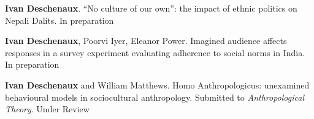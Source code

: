 


\begin{cvpublications}

  \cvpublication
  {\textbf{Ivan Deschenaux}. ``No culture of our own'': the impact of ethnic politics on Nepali Dalits.} %
    {In preparation} %

  \cvpublication
  {\textbf{Ivan Deschenaux}, Poorvi Iyer, Eleanor Power. Imagined audience affects responses in a survey experiment evaluating adherence to social norms in India.} %
    {In preparation} %

  \cvpublication
  {\textbf{Ivan Deschenaux} and William Matthews. Homo Anthropologicus: unexamined behavioural models in sociocultural anthropology. Submitted to \textit{Anthropological Theory}.} %
    {Under Review} %

\end{cvpublications}


